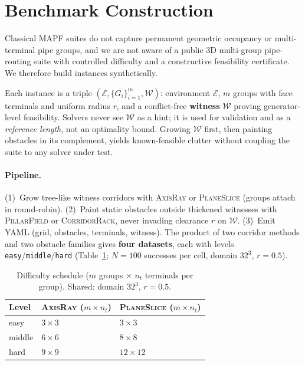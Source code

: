 
\section{Benchmark Construction}
\label{sec:benchmark}

Classical MAPF suites do not capture permanent geometric occupancy or
multi-terminal pipe groups, and we are not aware of a public 3D multi-group
pipe-routing suite with controlled difficulty and a constructive feasibility
certificate. We therefore build instances synthetically.

Each instance is a triple $(\mathcal{E},\{G_i\}_{i=1}^{m},\mathcal{W})$:
environment $\mathcal{E}$, $m$ groups with face terminals and uniform radius
$r$, and a conflict-free \textbf{witness} $\mathcal{W}$ proving generator-level
feasibility. Solvers never see $\mathcal{W}$ as a hint; it is used for
validation and as a \emph{reference length}, not an optimality bound.
Growing $\mathcal{W}$ first, then painting obstacles in its complement, yields
known-feasible clutter without coupling the suite to any solver under test.

\paragraph{Pipeline.}
(1)~Grow tree-like witness corridors with \textsc{AxisRay} or
\textsc{PlaneSlice} (groups attach in round-robin).
(2)~Paint static obstacles outside thickened witnesses with
\textsc{PillarField} or \textsc{CorridorRack}, never invading clearance $r$ on
$\mathcal{W}$.
(3)~Emit YAML (grid, obstacles, terminals, witness).
The product of two corridor methods and two obstacle families gives
\textbf{four datasets}, each with levels
\texttt{easy}/\texttt{middle}/\texttt{hard}
(Table~\ref{tab:difficulty}; $N{=}100$ successes per cell, domain $32^3$,
$r{=}0.5$).

\begin{table}[t]
  \centering
  \caption{Difficulty schedule ($m$ groups $\times$ $n_t$ terminals per group).
  Shared: domain $32^3$, $r{=}0.5$.}
  \label{tab:difficulty}
  \begin{tabular}{@{}lll@{}}
    \toprule
    Level & \textsc{AxisRay} ($m \times n_t$) & \textsc{PlaneSlice} ($m \times n_t$) \\
    \midrule
    easy   & $3\times 3$ & $3\times 3$ \\
    middle & $6\times 6$ & $8\times 8$ \\
    hard   & $9\times 9$ & $12\times 12$ \\
    \bottomrule
  \end{tabular}
\end{table}


